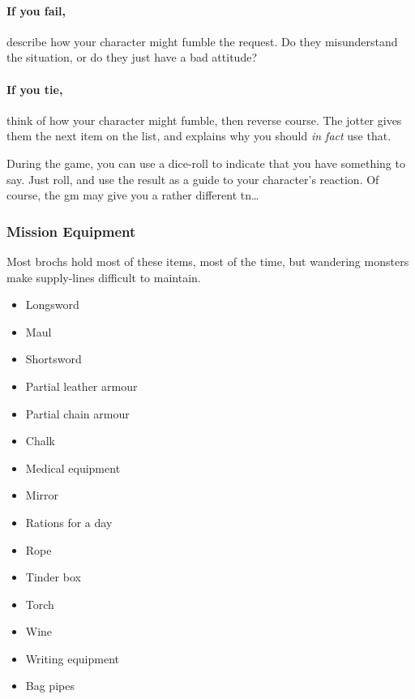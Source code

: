 \begin{multicols}{2}
\paragraph{If you fail,}
describe how your character might fumble the request.
Do they misunderstand the situation, or do they just have a bad attitude?

\paragraph{If you tie,}
think of how your character might fumble, then reverse course.
The jotter gives them the next item on the list, and explains why you should \emph{in fact} use that.

During the game, you can use a dice-roll to indicate that you have something to say.
Just roll, and use the result as a guide to your character's reaction.%
Of course, the \gls{gm} may give you a rather different \gls{tn}\ldots

\subsubsection{Mission Equipment}
\label{start_equipment}

Most \glspl{broch} hold most of these items, most of the time, but wandering monsters make supply-lines difficult to maintain.

\begin{multicols}{2}
\begin{itemize}
\raggedright
  \item
  Longsword
  \item
  Maul
  \item
  Shortsword
  \item
  Partial leather armour
  \item
  Partial chain armour
  \item
  Chalk
  \item
  Medical equipment
  \item
  Mirror
  \item
  Rations for a day
  \item
  Rope
  \item
  Tinder box
  \item
  Torch
  \item
  Wine
  \item
  Writing equipment
  \item
  Bag pipes
\end{itemize}
\end{multicols}

\commonArmourChart

\commonWeaponsChart %
\label{commonWeapons}

\end{multicols}

